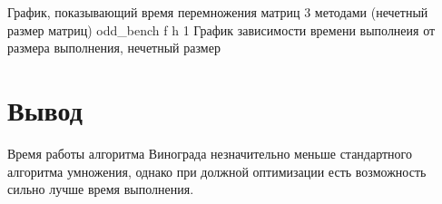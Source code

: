 График, показывающий время перемножения матриц 3 методами (нечетный размер матриц)\newline
{}
{odd_bench} %
{f} %
{h} %
{1\textwidth} %
{График зависимости времени выполнеия от размера выполнения, нечетный размер} %

\section*{Вывод}

Время работы алгоритма Винограда незначительно меньше стандартного алгоритма умножения, однако при должной оптимизации есть возможность сильно лучше время выполнения.
